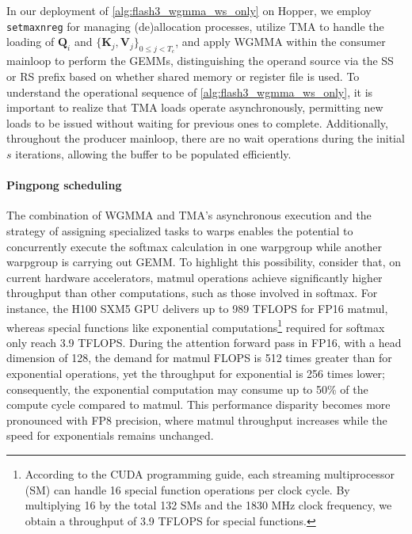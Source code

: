 In our deployment of \cref{alg:flash3_wgmma_ws_only} on Hopper, we employ \verb|setmaxnreg| for managing (de)allocation processes, utilize TMA to handle the loading of $\mathbf{Q}_i$ and $\{ \mathbf{K}_j, \mathbf{V}_j \}_{0 \leq j < T_c}$, and apply WGMMA within the consumer mainloop to perform the GEMMs, distinguishing the operand source via the SS or RS prefix based on whether shared memory or register file is used. To understand the operational sequence of \cref{alg:flash3_wgmma_ws_only}, it is important to realize that TMA loads operate asynchronously, permitting new loads to be issued without waiting for previous ones to complete. Additionally, throughout the producer mainloop, there are no wait operations during the initial $s$ iterations, allowing the buffer to be populated efficiently.

\paragraph{Pingpong scheduling} The combination of WGMMA and TMA's asynchronous execution and the strategy of assigning specialized tasks to warps enables the potential to concurrently execute the softmax calculation in one warpgroup while another warpgroup is carrying out GEMM. To highlight this possibility, consider that, on current hardware accelerators, matmul operations achieve significantly higher throughput than other computations, such as those involved in softmax. For instance, the H100 SXM5 GPU delivers up to 989 TFLOPS for FP16 matmul, whereas special functions like exponential computations\footnote{According to the CUDA programming guide, each streaming multiprocessor (SM) can handle 16 special function operations per clock cycle. By multiplying 16 by the total 132 SMs and the 1830 MHz clock frequency, we obtain a throughput of 3.9 TFLOPS for special functions.} required for softmax only reach 3.9 TFLOPS. During the attention forward pass in FP16, with a head dimension of 128, the demand for matmul FLOPS is 512 times greater than for exponential operations, yet the throughput for exponential is 256 times lower; consequently, the exponential computation may consume up to 50\% of the compute cycle compared to matmul. This performance disparity becomes more pronounced with FP8 precision, where matmul throughput increases while the speed for exponentials remains unchanged.

